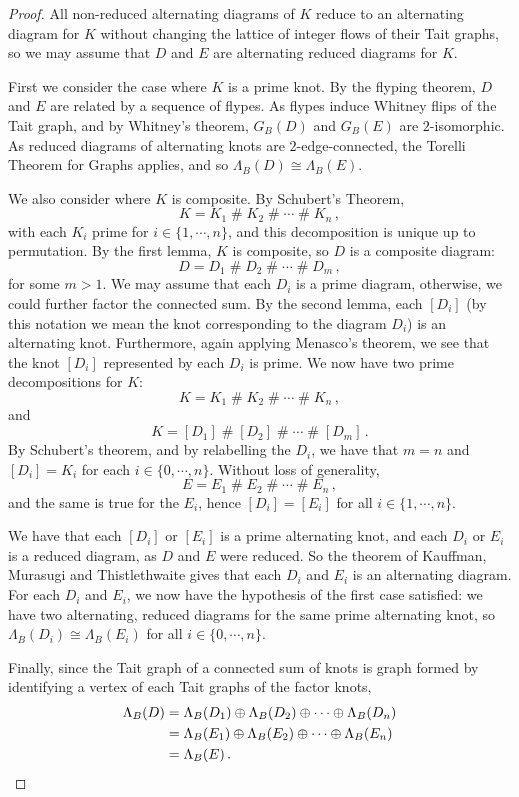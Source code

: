 \documentclass[12pt]{report}
\newcommand{\hash}{\ensuremath{\mathbin{\#}}}
\begin{document}
\begin{proof}
All non-reduced alternating diagrams of $K$ reduce to an alternating diagram for $K$ without changing the lattice of integer flows of their Tait graphs, so we may assume that $D$ and $E$ are alternating reduced diagrams for $K$. 

First we consider the case where $K$ is a prime knot. By the flyping theorem, $D$ and $E$ are related by a sequence of flypes. As flypes induce Whitney flips of the Tait graph, and by Whitney's theorem, $G_{B}(D)$ and $G_{B}(E)$ are $2$-isomorphic. As reduced diagrams of alternating knots are $2$-edge-connected, the Torelli Theorem for Graphs applies, and so $\Lambda_{B}(D) \cong \Lambda_{B}(E)$.

We also consider where $K$ is composite. By Schubert's Theorem,
\[K = K_{1}  \hash K_{2}  \hash \cdots  \hash K_{n}\,,\]
with each $K_{i}$ prime for $i \in \{1, \cdots, n\}$, and this decomposition is unique up to permutation. By the first lemma, $K$ is composite, so $D$ is a composite diagram:
\[D = D_{1}  \hash D_{2}  \hash \cdots  \hash D_{m}\,,\]
for some $m > 1$. We may assume that each $D_{i}$ is a prime diagram, otherwise, we could further factor the connected sum. By the second lemma, each $[D_{i}]$ (by this notation we mean the knot corresponding to the diagram $D_{i}$) is an alternating knot. Furthermore, again applying Menasco's theorem, we see that the knot $[D_{i}]$ represented by each $D_{i}$ is prime. We now have two prime decompositions for $K$:
\[K = K_{1}  \hash K_{2}  \hash \cdots  \hash K_{n}\,,\]
and
\[K = [D_{1}]  \hash [D_{2}]  \hash \cdots  \hash [D_{m}]\,.\]
By Schubert's theorem, and by relabelling the $D_{i}$, we have that $m = n$ and $[D_{i}] = K_{i}$
for each $i \in \{0, \cdots, n\}$. Without loss of generality, \[E = E_{1} \hash E_{2} \hash \cdots \hash E_{n}\,,\] and the same is true for the $E_{i}$, hence
$[D_{i}] = [E_{i}]$
for all $i \in \{1, \cdots, n\}$.

We have that each $[D_{i}]$ or $[E_{i}]$ is a prime alternating knot, and each $D_{i}$ or $E_{i}$ is a reduced diagram, as $D$ and $E$ were reduced. So the theorem of Kauffman, Murasugi and Thistlethwaite gives that each $D_{i}$ and $E_{i}$ is an alternating diagram. For each $D_{i}$ and $E_{i}$, we now have the hypothesis of the first case satisfied: we have two alternating, reduced diagrams for the same prime alternating knot, so $\Lambda_{B}(D_{i}) \cong \Lambda_{B}(E_{i})$ for all $i \in \{0, \cdots, n\}$.

Finally, since the Tait graph of a connected sum of knots is graph formed by identifying a vertex of each Tait graphs of the factor knots,
\begin{align*}
	\Lambda_{B}(D) & = \Lambda_{B}(D_{1}) \oplus \Lambda_{B}(D_{2}) \oplus \cdots \oplus \Lambda_{B}(D_{n}) \\
	               & = \Lambda_{B}(E_{1}) \oplus \Lambda_{B}(E_{2}) \oplus \cdots \oplus \Lambda_{B}(E_{n})\\
	               & = \Lambda_{B}(E)\,. \qedhere \\ 
\end{align*}
\end{proof}
\end{document}
